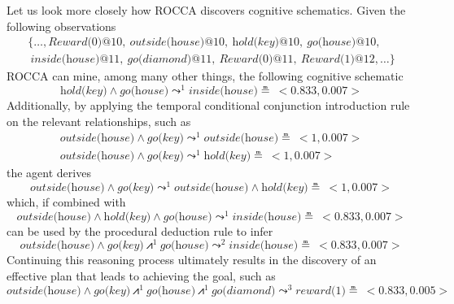 \documentclass[runningheads]{llncs}
\newcommand{\lpreimp}[1]{\leadsto^{#1}}
\newcommand{\lseqand}[1]{\!\bigslopedwedge^{#1}\!}
\begin{document}
Let us look more closely how ROCCA discovers cognitive
schematics. Given the following observations
$$
\begin{array}{l}
\{\dots, \textit{Reward(0)@10},\ \textit{outside(house)@10},\
\textit{hold(key)@10},\ \textit{go(house)@10},\\ \ \textit{inside(house)@11},\ \textit{go(diamond)@11},\ \textit{Reward(0)@11},\ \textit{Reward(1)@12}, \dots\}
\end{array}
$$
ROCCA can mine, among many other things, the following cognitive schematic
$$
\textit{hold(key)} \land \textit{go(house)} \lpreimp{1} \textit{inside(house)} \measeq\ <\!0.833, 0.007\!>
$$
Additionally, by applying the temporal conditional conjunction
introduction rule on the relevant relationships, such as
$$
\begin{array}{l}
\textit{outside(house)} \land \textit{go(key)} \lpreimp{1} \textit{outside(house)} \measeq\ <\!1, 0.007\!> \\
\textit{outside(house)} \land \textit{go(key)} \lpreimp{1} \textit{hold(key)} \measeq\ <\!1, 0.007\!>
\end{array}
$$
the agent derives
$$\textit{outside(house)} \land \textit{go(key)} \lpreimp{1}
\textit{outside(house)} \land \textit{hold(key)} \measeq\ <\!1, 0.007\!>$$
which, if combined with
$$\textit{outside(house)} \land \textit{hold(key)} \land \textit{go(house)} \lpreimp{1} \textit{inside(house)} \measeq\ <\!0.833, 0.007\!>$$
can be used by the procedural deduction rule to infer
$$\textit{outside(house)} \land \textit{go(key)} \lseqand{1} \textit{go(house)} \lpreimp{2} \textit{inside(house)} \measeq\ <\!0.833, 0.007\!>$$
Continuing this reasoning process ultimately results in the discovery
of an effective plan that leads to achieving the goal, such as
{\small
$$\textit{outside(house)} \land \textit{go(key)} \lseqand{1}
\textit{go(house)} \lseqand{1} \textit{go(diamond)} \lpreimp{3}
\textit{reward(1)} \measeq\ <\!0.833, 0.005\!>$$ }
\end{document}
